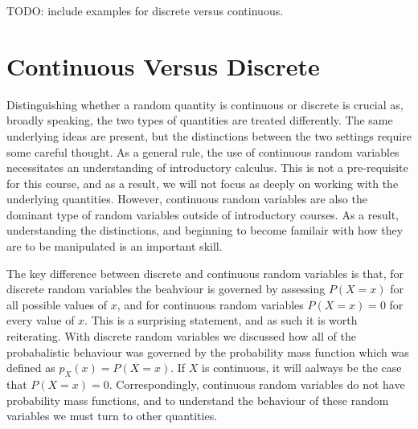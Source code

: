 \documentclass[
  letterpaper,
  DIV=11,
  numbers=noendperiod]{scrreprt}
\begin{document}
TODO: include examples for discrete versus continuous.

\section{Continuous Versus Discrete}\label{continuous-versus-discrete}

Distinguishing whether a random quantity is continuous or discrete is
crucial as, broadly speaking, the two types of quantities are treated
differently. The same underlying ideas are present, but the distinctions
between the two settings require some careful thought. As a general
rule, the use of continuous random variables necessitates an
understanding of introductory calculus. This is not a pre-requisite for
this course, and as a result, we will not focus as deeply on working
with the underlying quantities. However, continuous random variables are
also the dominant type of random variables outside of introductory
courses. As a result, understanding the distinctions, and beginning to
become familair with how they are to be manipulated is an important
skill.

The key difference between discrete and continuous random variables is
that, for discrete random variables the beahviour is governed by
assessing \(P(X=x)\) for all possible values of \(x\), and for
continuous random variables \(P(X=x)=0\) for every value of \(x\). This
is a surprising statement, and as such it is worth reiterating. With
discrete random variables we discussed how all of the probabalistic
behaviour was governed by the probability mass function which was
defined as \(p_X(x) = P(X=x)\). If \(X\) is continuous, it will aalways
be the case that \(P(X=x) = 0\). Correspondingly, continuous random
variables do not have probability mass functions, and to understand the
behaviour of these random variables we must turn to other quantities.
\end{document}
